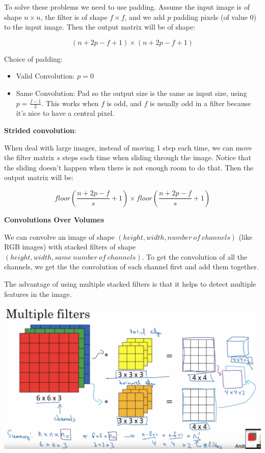 \documentclass{article}
\begin{document}
\noindent To solve these problems we need to use padding. Assume the input image is of shape \(n \times n\), the filter is of shape \(f \times f\), and we add \(p\) padding pixels (of value 0) to the input image. Then the output matrix will be of shape:

\[(n + 2p - f + 1) \times (n + 2p - f + 1)\]

\noindent Choice of padding:

\begin{itemize}
    \item Valid Convolution: \(p = 0\)
    \item Same Convolution: Pad so the output size is the same as input size, using \(p = \frac{f - 1}{2}\). This works when \(f\) is odd, and \(f\) is usually odd in a filter because it's nice to have a central pixel.
\end{itemize}

\noindent \textbf{Strided convolution}:

\noindent When deal with large images, instead of moving 1 step each time, we can move the filter matrix \(s\) steps each time when sliding through the image. Notice that the sliding doesn't happen when there is not enough room to do that. Then the output matrix will be:

\[floor(\frac{n + 2p - f}{s}  + 1) \times floor(\frac{n + 2p - f}{s} + 1)\]

\noindent \textbf{Convolutions Over Volumes}

\noindent We can convolve an image of shape \((height, width, number \ of \ channels)\) (like RGB images) with stacked filters of shape \((height, width, same \ number \ of \ channels)\). To get the convolution of all the channels, we get the the convolution of each channel first and add them together.

\bigskip

\noindent The advantage of using multiple stacked filters is that it helps to detect multiple features in the image.

\begin{center}
\includegraphics[scale=0.2]{./images/convolutions_over_volumes.png}
\end{center}
\end{document}
